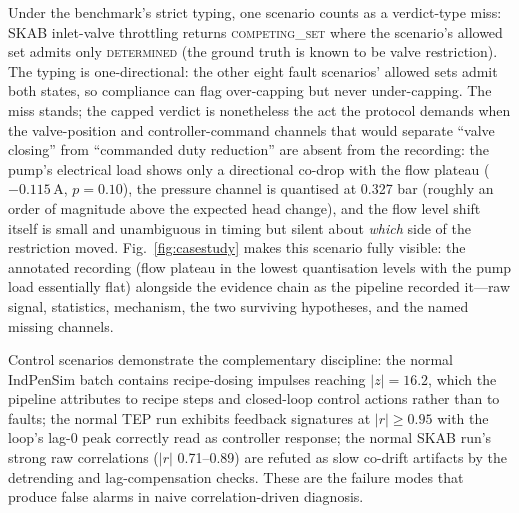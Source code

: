 \documentclass[preprint,10pt]{elsarticle}
\begin{document}
Under the benchmark's strict typing, one scenario counts as a verdict-type miss: SKAB inlet-valve throttling returns \mbox{\textsc{competing\_set}} where the scenario's allowed set admits only \mbox{\textsc{determined}} (the ground truth is known to be valve restriction). The typing is one-directional: the other eight fault scenarios' allowed sets admit both states, so compliance can flag over-capping but never under-capping. The miss stands; the capped verdict is nonetheless the act the protocol demands when the valve-position and controller-command channels that would separate ``valve closing'' from ``commanded duty reduction'' are absent from the recording: the pump's electrical load shows only a directional co-drop with the flow plateau ($-0.115$\,A, $p{=}0.10$), the pressure channel is quantised at 0.327 bar (roughly an order of magnitude above the expected head change), and the flow level shift itself is small and unambiguous in timing but silent about \emph{which} side of the restriction moved. Fig.~\ref{fig:casestudy} makes this scenario fully visible: the annotated recording (flow plateau in the lowest quantisation levels with the pump load essentially flat) alongside the evidence chain as the pipeline recorded it---raw signal, statistics, mechanism, the two surviving hypotheses, and the named missing channels.

Control scenarios demonstrate the complementary discipline: the normal IndPenSim batch contains recipe-dosing impulses reaching $|z|{=}16.2$, which the pipeline attributes to recipe steps and closed-loop control actions rather than to faults; the normal TEP run exhibits feedback signatures at $|r|\ge 0.95$ with the loop's lag-0 peak correctly read as controller response; the normal SKAB run's strong raw correlations ($|r|$ 0.71--0.89) are refuted as slow co-drift artifacts by the detrending and lag-compensation checks. These are the failure modes that produce false alarms in naive correlation-driven diagnosis.
\end{document}
